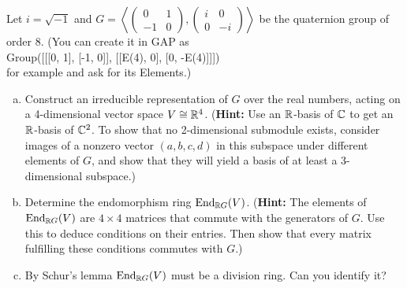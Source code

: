 \documentclass[leqno]{article}
\begin{document}
\newpage
\begin{problem}
Let $i=\sqrt{-1}$ and $G=\left\langle \begin{pmatrix} 0 & 1\\ -1 & 0\end{pmatrix}, \begin{pmatrix} i & 0 \\ 0 & -i \end{pmatrix}\right\rangle$ be the quaternion group of order 8. (You can create it in \textsf{GAP} as\\

\noindent \textsf{Group([[[0, 1], [-1, 0]], [[E(4), 0], [0, -E(4)]]])}\\

\noindent for example and ask for its \textsf{Elements}.)
\begin{enumerate}[(a)]
    \item Construct an irreducible representation of $G$ over the real numbers, acting on a 4-dimensional vector space $V\cong \mathbb{R}^4$. (\textbf{Hint:} Use an $\mathbb{R}$-basis of $\mathbb{C}$ to get an $\mathbb{R}$-basis of $\mathbb{C}^2$. To show that no 2-dimensional submodule exists, consider images of a nonzero vector $(a,b,c,d)$ in this subspace under different elements of $G$, and show that they will yield a basis of at least a 3-dimensional subspace.)
    \item Determine the endomorphism ring $\mathrm{End}_{\mathbb{R} G}(V)$. (\textbf{Hint:} The elements of $\mathrm{End}_{\mathbb{R} G}(V)$ are $4\times 4$ matrices that commute with the generators of $G$. Use this to deduce conditions on their entries. Then show that every matrix fulfilling these conditions commutes with $G$.)
    \item By Schur's lemma $\mathrm{End}_{\mathbb{R} G}(V)$ must be a division ring. Can you identify it?
\end{enumerate}
\end{problem}
\end{document}
